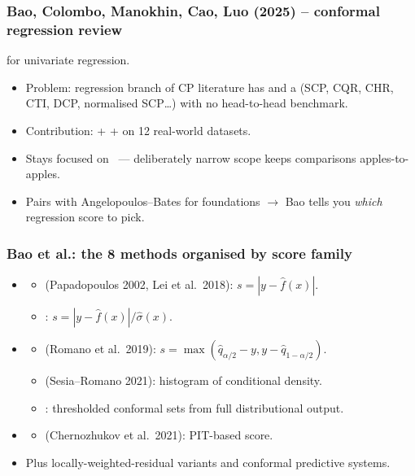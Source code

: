 \documentclass[11pt, aspectratio=169, xcolor={dvipsnames}, usepdftitle=false]{beamer}
\begin{document}
\begin{frame}
\frametitle{Bao, Colombo, Manokhin, Cao, Luo (2025) -- conformal regression review}
  for univariate regression.
\begin{itemize}
\item Problem: regression branch of CP literature has  and a  (SCP, CQR, CHR, CTI, DCP, normalised SCP\ldots) with no head-to-head benchmark.
\item Contribution:  +  +  on 12 real-world datasets.
\item Stays focused on ~--- deliberately narrow scope keeps comparisons apples-to-apples.
\item Pairs with Angelopoulos--Bates for foundations $\to$ Bao tells you \emph{which} regression score to pick.
\end{itemize}
\end{frame}

\begin{frame}
\frametitle{Bao et al.: the 8 methods organised by score family}
\begin{itemize}
\item {}
\begin{itemize}
\item {} (Papadopoulos 2002, Lei et al.\ 2018): $s = |y - \hat{f}(x)|$.
\item {}: $s = |y - \hat{f}(x)|/\hat{\sigma}(x)$.
\end{itemize}
\item {}
\begin{itemize}
\item {} (Romano et al.\ 2019): $s = \max(\hat{q}_{\alpha/2} - y, y - \hat{q}_{1-\alpha/2})$.
\item {} (Sesia--Romano 2021): histogram of conditional density.
\item {}: thresholded conformal sets from full distributional output.
\end{itemize}
\item {}
\begin{itemize}
\item {} (Chernozhukov et al.\ 2021): PIT-based score.
\end{itemize}
\item Plus locally-weighted-residual variants and conformal predictive systems.
\end{itemize}
\end{frame}
\end{document}
